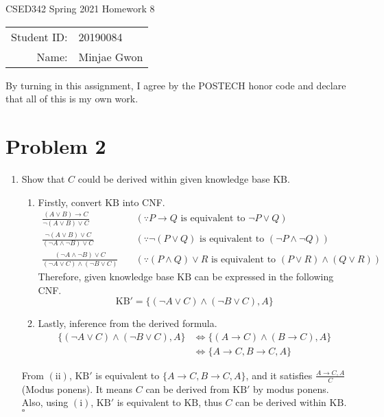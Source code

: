 \documentclass[12pt]{article}
\begin{document}
  \begin{center}
  {\Large CSED342 Spring 2021 Homework 8 \vspace{10pt}}

    \begin{tabular}{rl}
      Student ID: & 20190084 \\
      Name: & Minjae Gwon \\
    \end{tabular}
  \end{center}

  By turning in this assignment, I agree by the POSTECH honor code and declare that all of this is my own work.

  \section*{Problem 2}

  \begin{enumerate}[label=(\alph*)]
  \item Show that $C$ could be derived within given knowledge base $\mathrm{KB}$.
  \begin{enumerate}[label=(\roman*)]
  \item Firstly, convert $\mathrm{KB}$ into CNF.
  \begin{align*}
    \frac{(A \lor B) \rightarrow C}{\lnot(A \lor B) \lor C} & \quad (\because P \rightarrow Q \text{ is equivalent to } \lnot P \lor Q)\\
    \frac{\lnot(A \lor B) \lor C}{(\lnot A \land \lnot B) \lor C} & \quad (\because \lnot(P \lor Q) \text{ is equivalent to } (\lnot P \land \lnot Q)) \\
    \frac{(\lnot A \land \lnot B) \lor C}{(\lnot A \lor C) \land (\lnot B \lor C)} & \quad (\because (P \land Q) \lor R \text{ is equivalent to } (P \lor R) \land (Q \lor R))
  \end{align*}
  Therefore, given knowledge base $\mathrm{KB}$ can be expressed in the following CNF.
  \[\mathrm{KB}' = \{(\lnot A \lor C) \land (\lnot B \lor C), A\}\]
  \item Lastly, inference from the derived formula.
  \begin{align*}
    \{(\lnot A \lor C) \land (\lnot B \lor C), A\} &\iff \{(A \rightarrow C) \land (B \rightarrow C), A\} \\
    &\iff \{A \rightarrow C, B \rightarrow C, A\}
  \end{align*}
  \end{enumerate}
  From $\mathrm{(ii)}$, $\mathrm{KB}'$ is equivalent to $\{A \rightarrow C, B \rightarrow C, A\}$, and it satisfies $\frac{A \rightarrow C, A}{C}$ (Modus ponens). It means $C$ can be derived from $\mathrm{KB}'$ by modus ponens. Also, using $\mathrm{(i)}$, $\mathrm{KB}'$ is equivalent to $\mathrm{KB}$, thus $C$ can be derived within $\mathrm{KB}$. \quad $\square$



  \end{enumerate}
\end{document}
